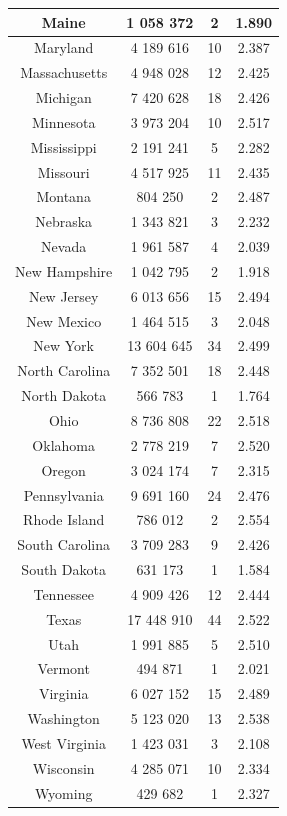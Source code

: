 \documentclass[a4paper,10pt,calibri,oneside,openany, twocolumn]{report}
\theoremstyle{break}
\begin{document}
\begin{table}[H]
\begin{tabular}{|c|c|c|c|}
	\hline
	Maine &1 058 372&2&1.890\\
	\hline
	Maryland &4 189 616&10&2.387\\
	\hline
	Massachusetts &4 948 028&12&2.425\\
	\hline
	Michigan &7 420 628&18&2.426\\
	\hline
	Minnesota &3 973 204&10&2.517\\
	\hline
	Mississippi &2 191 241&5&2.282\\
	\hline
	Missouri &4 517 925&11&2.435\\
	\hline
	Montana &804 250&2&2.487\\
	\hline
	Nebraska &1 343 821&3&2.232\\
	\hline
	Nevada &1 961 587&4&2.039\\
	\hline
	New Hampshire &1 042 795&2&1.918\\
	\hline
	New Jersey &6 013 656&15&2.494\\
	\hline
	New Mexico &1 464 515&3&2.048\\
	\hline
	New York &13 604 645&34&2.499\\
	\hline
	North Carolina &7 352 501&18&2.448\\
	\hline
	North Dakota &566 783&1&1.764\\
	\hline
	Ohio &8 736 808&22&2.518\\
	\hline
	Oklahoma &2 778 219&7&2.520\\
	\hline
	Oregon &3 024 174&7&2.315\\
	\hline
	Pennsylvania &9 691 160&24&2.476\\
	\hline
	Rhode Island &786 012&2&2.554\\
	\hline
	South Carolina &3 709 283&9&2.426\\
	\hline
	South Dakota &631 173&1&1.584\\
	\hline
	Tennessee &4 909 426&12&2.444\\
	\hline
	Texas &17 448 910&44&2.522\\
	\hline
	Utah &1 991 885&5&2.510\\
	\hline
	Vermont &494 871&1&2.021\\
	\hline
	Virginia &6 027 152&15&2.489\\
	\hline
	Washington &5 123 020&13&2.538\\
	\hline
	West Virginia &1 423 031&3&2.108\\
	\hline
	Wisconsin &4 285 071&10&2.334\\
	\hline
	Wyoming &429 682&1&2.327\\
	\hline
	\end{tabular}
\end{table}
\end{document}
